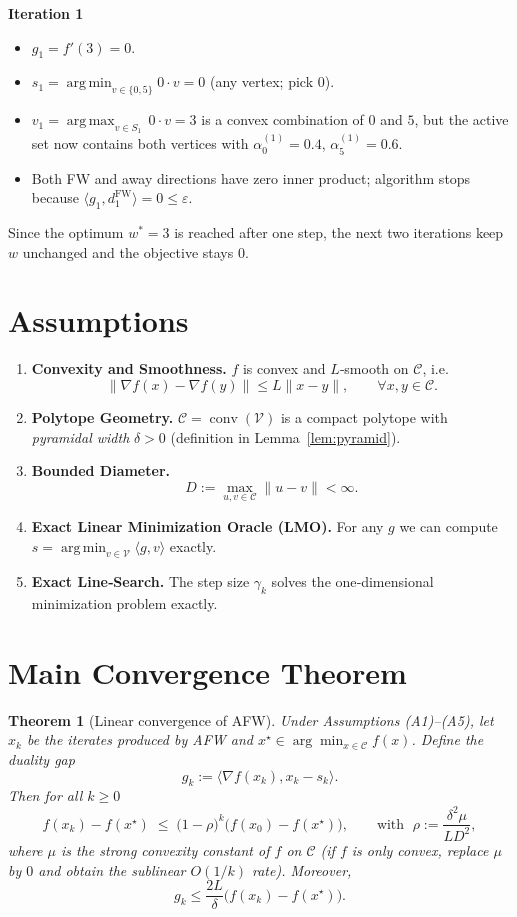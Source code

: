 \documentclass{article}
\newtheorem{theorem}{Theorem}
\newcommand{\conv}{\operatorname{conv}}
\newcommand{\argmin}{\operatorname*{arg\,min}}
\newcommand{\argmax}{\operatorname*{arg\,max}}
\begin{document}
\textbf{Iteration 1}
\begin{itemize}
\item $g_1=f'(3)=0$.
\item $s_1=\argmin_{v\in\{0,5\}}0\cdot v=0$ (any vertex; pick $0$).
\item $v_1=\argmax_{v\in S_1}\,0\cdot v=3$ is a convex combination of $0$ and $5$,
      but the active set now contains both vertices with $\alpha_0^{(1)}=0.4$, $\alpha_5^{(1)}=0.6$.
\item Both FW and away directions have zero inner product; algorithm stops because
      $\langle g_1,d^{\mathrm{FW}}_1\rangle=0\le\varepsilon$.
\end{itemize}

Since the optimum $w^*=3$ is reached after one step, the next two iterations keep $w$ unchanged and the objective stays $0$.

\section*{Assumptions}
\begin{enumerate}
\item \textbf{Convexity and Smoothness.} $f$ is convex and $L$‑smooth on $\mathcal C$, i.e.  
\[
\|\nabla f(x)-\nabla f(y)\|\le L\|x-y\|,\qquad\forall x,y\in\mathcal C.
\tag{A1}
\]
\item \textbf{Polytope Geometry.} $\mathcal C=\conv(\mathcal V)$ is a compact polytope with
\emph{pyramidal width} $\delta>0$ (definition in Lemma~\ref{lem:pyramid}).
\item \textbf{Bounded Diameter.} 
\[
D:=\max_{u,v\in\mathcal C}\|u-v\|<\infty .
\tag{A3}
\]
\item \textbf{Exact Linear Minimization Oracle (LMO).} For any $g$ we can compute 
$s=\argmin_{v\in\mathcal V}\langle g,v\rangle$ exactly.
\item \textbf{Exact Line‑Search.} The step size $\gamma_k$ solves the one‑dimensional
minimization problem exactly.
\end{enumerate}

\section*{Main Convergence Theorem}
\begin{theorem}[Linear convergence of AFW]\label{thm:linear}
Under Assumptions (A1)–(A5), let $x_k$ be the iterates produced by AFW and
$x^{\star}\in\arg\min_{x\in\mathcal C}f(x)$. Define the \emph{duality gap}
\[
g_k:=\langle\nabla f(x_k),x_k-s_k\rangle .
\]
Then for all $k\ge 0$
\[
f(x_k)-f(x^{\star})\;\le\;\bigl(1-\rho\bigr)^k\bigl(f(x_0)-f(x^{\star})\bigr),
\qquad\text{with }\;
\rho:=\frac{\delta^2\mu}{L D^2},
\tag{T1}
\]
where $\mu$ is the strong convexity constant of $f$ on $\mathcal C$ (if $f$ is only convex,
replace $\mu$ by $0$ and obtain the sublinear $O(1/k)$ rate). Moreover,
\[
g_k\le \frac{2L}{\delta}\bigl(f(x_k)-f(x^{\star})\bigr).
\tag{T2}
\]
\end{theorem}
\end{document}
